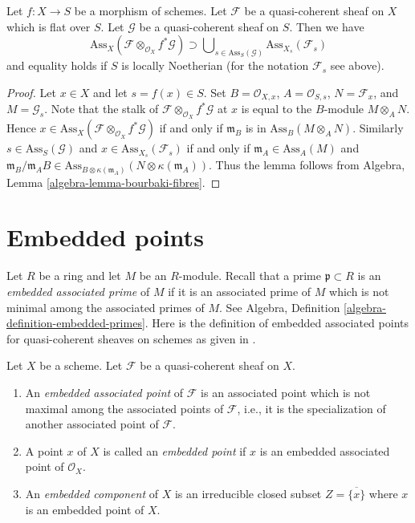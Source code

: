\begin{lemma}
\label{lemma-bourbaki}
Let $f : X \to S$ be a morphism of schemes.
Let $\mathcal{F}$ be a quasi-coherent sheaf on $X$ which is flat over $S$.
Let $\mathcal{G}$ be a quasi-coherent sheaf on $S$.
Then we have
$$
\text{Ass}_X(\mathcal{F} \otimes_{\mathcal{O}_X} f^*\mathcal{G})
\supset
\bigcup\nolimits_{s \in \text{Ass}_S(\mathcal{G})}
\text{Ass}_{X_s}(\mathcal{F}_s)
$$
and equality holds if $S$ is locally Noetherian (for the notation
$\mathcal{F}_s$ see above).
\end{lemma}

\begin{proof}
Let $x \in X$ and let $s = f(x) \in S$.
Set $B = \mathcal{O}_{X, x}$, $A = \mathcal{O}_{S, s}$,
$N = \mathcal{F}_x$, and $M = \mathcal{G}_s$.
Note that the stalk of $\mathcal{F} \otimes_{\mathcal{O}_X} f^*\mathcal{G}$
at $x$ is equal to the $B$-module $M \otimes_A N$. Hence
$x \in \text{Ass}_X(\mathcal{F} \otimes_{\mathcal{O}_X} f^*\mathcal{G})$
if and only if $\mathfrak m_B$ is in $\text{Ass}_B(M \otimes_A N)$.
Similarly $s \in \text{Ass}_S(\mathcal{G})$ and
$x \in \text{Ass}_{X_s}(\mathcal{F}_s)$ if and only if
$\mathfrak m_A \in \text{Ass}_A(M)$ and
$\mathfrak m_B/\mathfrak m_A B \in
\text{Ass}_{B \otimes \kappa(\mathfrak m_A)}(N \otimes \kappa(\mathfrak m_A))$.
Thus the lemma follows from
Algebra, Lemma \ref{algebra-lemma-bourbaki-fibres}.
\end{proof}





\section{Embedded points}
\label{section-embedded}

\noindent
Let $R$ be a ring and let $M$ be an $R$-module.
Recall that a prime $\mathfrak p \subset R$ is an
{\it embedded associated prime} of $M$ if it is an associated prime of
$M$ which is not minimal among the associated primes of $M$. See
Algebra, Definition \ref{algebra-definition-embedded-primes}.
Here is the definition of embedded associated points
for quasi-coherent sheaves on schemes
as given in \cite[IV Definition 3.1.1]{EGA}.

\begin{definition}
\label{definition-embedded}
Let $X$ be a scheme.
Let $\mathcal{F}$ be a quasi-coherent sheaf on $X$.
\begin{enumerate}
\item An {\it embedded associated point} of $\mathcal{F}$
is an associated point which is not maximal among the
associated points of $\mathcal{F}$, i.e., it is the specialization
of another associated point of $\mathcal{F}$.
\item A point $x$ of $X$ is called an {\it embedded point}
if $x$ is an embedded associated point of $\mathcal{O}_X$.
\item An {\it embedded component} of $X$ is an irreducible
closed subset $Z = \overline{\{x\}}$ where $x$ is an embedded
point of $X$.
\end{enumerate}
\end{definition}

